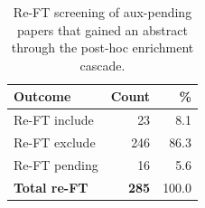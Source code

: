 \begin{table}[htbp]
\centering
\caption{Re-FT screening of aux-pending papers that gained an abstract through the post-hoc enrichment cascade.}
\label{tab:aux-reft}
\begin{tabular}{lrr}
\toprule
\textbf{Outcome} & \textbf{Count} & \textbf{\%} \\
\midrule
Re-FT include & 23 & 8.1 \\
Re-FT exclude & 246 & 86.3 \\
Re-FT pending & 16 & 5.6 \\
\midrule
\textbf{Total re-FT} & \textbf{285} & 100.0 \\
\bottomrule
\end{tabular}
\end{table}